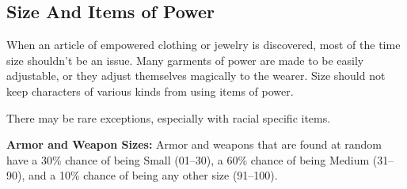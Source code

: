 \subsection{Size And Items of Power}
When an article of empowered clothing or jewelry is discovered, most of the time size shouldn't be an issue. Many garments of power are made to be easily adjustable, or they adjust themselves magically to the wearer. Size should not keep characters of various kinds from using items of power.

There may be rare exceptions, especially with racial specific items.

\textbf{Armor and Weapon Sizes:} Armor and weapons that are found at random have a 30\% chance of being Small (01--30), a 60\% chance of being Medium (31--90), and a 10\% chance of being any other size (91--100). 